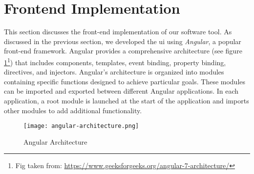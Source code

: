 
\section{Frontend Implementation}
\label{implementation:section:frontend}

This section discusses the front-end implementation of our software tool. 
As discussed in the previous section, we developed the \ac{ui} using \textit{Angular}, a popular front-end framework. 
Angular provides a comprehensive architecture (see figure \ref{implementation:fig:angulararchitecture}\footnote{Fig taken from: \url{https://www.geeksforgeeks.org/angular-7-architecture/}}) that includes components, templates, event binding, property binding, directives, and injectors. 
Angular's architecture is organized into modules containing specific functions designed to achieve particular goals. 
These modules can be imported and exported between different Angular applications. 
In each application, a root module is launched at the start of the application and imports other modules to add additional functionality.

\begin{figure}[ht]
    \centering
    \texttt{[image: angular-architecture.png]}
    \caption[Angular Architecture]{Angular Architecture}
    \label{implementation:fig:angulararchitecture}
\end{figure}

